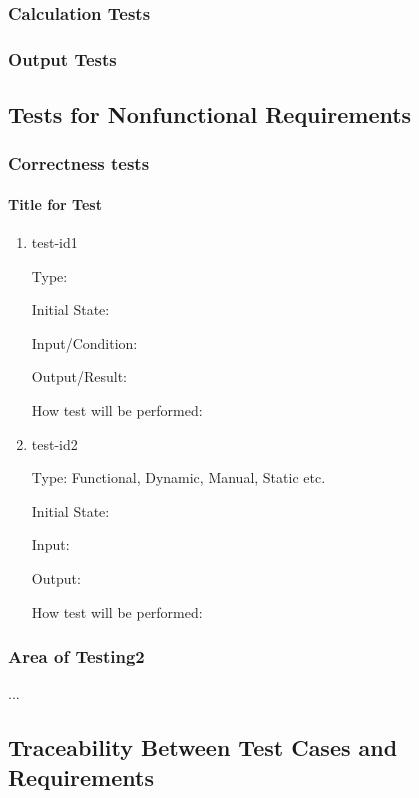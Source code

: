 \documentclass[12pt, titlepage]{article}
\begin{document}
\subsubsection{Calculation Tests}

\subsubsection{Output Tests}

\subsection{Tests for Nonfunctional Requirements}

\subsubsection{Correctness tests}
		
\paragraph{Title for Test}

\begin{enumerate}

\item{test-id1\\}

Type: 
					
Initial State: 
					
Input/Condition: 
					
Output/Result: 
					
How test will be performed: 
					
\item{test-id2\\}

Type: Functional, Dynamic, Manual, Static etc.
					
Initial State: 
					
Input: 
					
Output: 
					
How test will be performed: 

\end{enumerate}

\subsubsection{Area of Testing2}

...

\subsection{Traceability Between Test Cases and Requirements}
\end{document}
